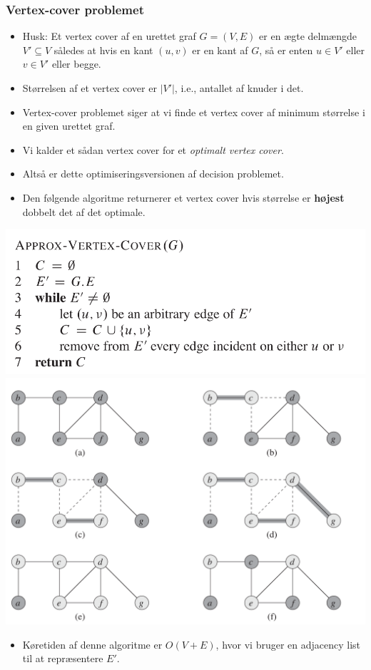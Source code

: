 \begin{frame}[allowframebreaks]
  \frametitle{Vertex-cover problemet}
\begin{itemize}
  \item Husk: Et vertex cover af en urettet graf $G = (V,E)$ er en ægte delmængde $V' \subseteq V$ således at hvis en kant $(u,v)$ er en kant af $G$, så er enten $u \in V'$ eller $v \in V'$ eller begge.
  \item Størrelsen af et vertex cover er $|V'|$, i.e., antallet af knuder i det.
  \item Vertex-cover problemet siger at vi finde et vertex cover af minimum størrelse i en given urettet graf.
  \item Vi kalder et sådan vertex cover for et \textit{optimalt vertex cover}.
  \item Altså er dette optimiseringsversionen af decision problemet.
  \item Den følgende algoritme returnerer et vertex cover hvis størrelse er \textbf{højest} dobbelt det af det optimale.
\end{itemize}
\begin{center}
  \includegraphics[scale=0.45]{figur/approxvertexcover.png}
  \includegraphics[scale=0.35]{figur/figur3501.png}
\end{center}
\begin{itemize}
  \item Køretiden af denne algoritme er $O(V+E)$, hvor vi bruger en adjacency list til at repræsentere $E'$.
\end{itemize}


\end{frame}
